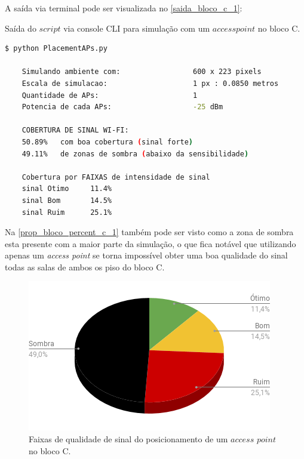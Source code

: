 \documentclass[
	12pt,				%
	twoside,			%
	a4paper,			%
	english,			%
	french,				%
	spanish,			%
	brazil				%
	]{abntex2}
\begin{document}
A saída via terminal pode ser visualizada no \autoref{saida_bloco_c_1}:

\begin{quadro}[!htb]
    \caption{\label{saida_bloco_c_1} Saída do $script$ via console CLI para simulação com um $access point$ no bloco C. }

    \begin{lstlisting}[language=bash]
    $ python PlacementAPs.py 
    
    Simulando ambiente com:                 600 x 223 pixels
    Escala de simulacao:                    1 px : 0.0850 metros
    Quantidade de APs:                      1
    Potencia de cada APs:                   -25 dBm
        
    COBERTURA DE SINAL WI-FI:
    50.89%   com boa cobertura (sinal forte)
    49.11%   de zonas de sombra (abaixo da sensibilidade)
    
    Cobertura por FAIXAS de intensidade de sinal
    sinal Otimo     11.4%
    sinal Bom       14.5%
    sinal Ruim      25.1%

\end{lstlisting}

\end{quadro}

Na \autoref{prop_bloco_percent_c_1} também pode ser visto como a zona de
sombra esta presente com a maior parte da simulação, o que fica notável
que utilizando apenas um \emph{access point} se torna impossível obter
uma boa qualidade do sinal todas as salas de ambos os piso do bloco C.

\begin{figure}[ht]
    \caption{\label{prop_bloco_percent_c_1} Faixas de qualidade de sinal do posicionamento de um $access$ $point$ no bloco C.}
    \begin{center}
        \includegraphics[scale=0.7]{imagens/prop-bloco-percent-c-1.png}
    \end{center}
\end{figure}
\end{document}
